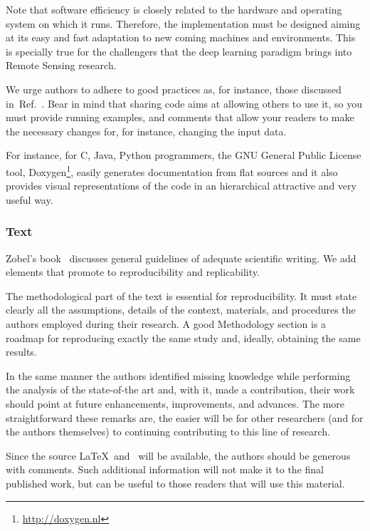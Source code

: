 \documentclass[journal,twoside]{IEEEtran}
\begin{document}
Note that software efficiency is closely related to the hardware and operating system on which it runs.
Therefore, the implementation must be designed aiming at its easy and fast adaptation to new coming machines and environments. 
This is specially true for the challengers that the deep learning paradigm brings into Remote Sensing research.

We urge authors to adhere to good practices as, for instance, those discussed in~Ref.~\cite[Chapter 7]{WritingScientificSoftware}.
Bear in mind that sharing code aims at allowing others to use it, so you must provide running examples, and comments that allow your readers to make the necessary changes for, for instance, changing the input data.

For instance, for C, Java, Python programmers, the  GNU General Public License tool, Doxygen\footnote{\url{http://doxygen.nl}}, easily generates documentation from flat sources and it also provides visual representations of the code in an hierarchical attractive and very useful way.

\subsubsection{Text}

Zobel's book~\cite{WritingforComputerScience} discusses general guidelines of adequate scientific writing.
We add elements that promote to reproducibility and replicability.

The methodological part of the text is essential for reproducibility.
It must state clearly all the assumptions, details of the context, materials, and procedures the authors employed during their research.
A good Methodology section is a roadmap for reproducing exactly the same study and, ideally, obtaining the same results.

In the same manner the authors identified missing knowledge while performing the analysis of the state-of-the art and, with it, made a contribution, their work should point at future enhancements, improvements, and advances.
The more straightforward these remarks are, the easier will be for other researchers (and for the authors themselves) to continuing contributing to this line of research.

Since the source \LaTeX\ and \BibTeX\ will be available, the authors should be generous with comments.
Such additional information will not make it to the final published work, but can be useful to those readers that will use this material.
\end{document}
